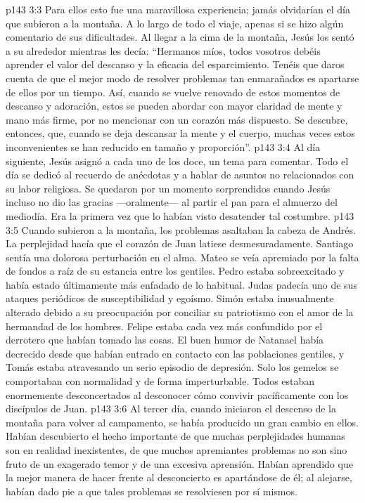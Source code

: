 \vs p143 3:3 \pc Para ellos esto fue una maravillosa experiencia; jamás olvidarían el día que subieron a la montaña. A lo largo de todo el viaje, apenas si se hizo algún comentario de sus dificultades. Al llegar a la cima de la montaña, Jesús los sentó a su alrededor mientras les decía: “Hermanos míos, todos vosotros debéis aprender el valor del descanso y la eficacia del esparcimiento. Tenéis que daros cuenta de que el mejor modo de resolver problemas tan enmarañados es apartarse de ellos por un tiempo. Así, cuando se vuelve renovado de estos momentos de descanso y adoración, estos se pueden abordar con mayor claridad de mente y mano más firme, por no mencionar con un corazón más dispuesto. Se descubre, entonces, que, cuando se deja descansar la mente y el cuerpo, muchas veces estos inconvenientes se han reducido en tamaño y proporción”.
\vs p143 3:4 Al día siguiente, Jesús asignó a cada uno de los doce, un tema para comentar. Todo el día se dedicó al recuerdo de anécdotas y a hablar de asuntos no relacionados con su labor religiosa. Se quedaron por un momento sorprendidos cuando Jesús incluso no dio las gracias ---oralmente--- al partir el pan para el almuerzo del mediodía. Era la primera vez que lo habían visto desatender tal costumbre.
\vs p143 3:5 Cuando subieron a la montaña, los problemas asaltaban la cabeza de Andrés. La perplejidad hacía que el corazón de Juan latiese desmesuradamente. Santiago sentía una dolorosa perturbación en el alma. Mateo se veía apremiado por la falta de fondos a raíz de su estancia entre los gentiles. Pedro estaba sobreexcitado y había estado últimamente más enfadado de lo habitual. Judas padecía uno de sus ataques periódicos de susceptibilidad y egoísmo. Simón estaba inusualmente alterado debido a su preocupación por conciliar su patriotismo con el amor de la hermandad de los hombres. Felipe estaba cada vez más confundido por el derrotero que habían tomado las cosas. El buen humor de Natanael había decrecido desde que habían entrado en contacto con las poblaciones gentiles, y Tomás estaba atravesando un serio episodio de depresión. Solo los gemelos se comportaban con normalidad y de forma imperturbable. Todos estaban enormemente desconcertados al desconocer cómo convivir pacíficamente con los discípulos de Juan.
\vs p143 3:6 Al tercer día, cuando iniciaron el descenso de la montaña para volver al campamento, se había producido un gran cambio en ellos. Habían descubierto el hecho importante de que muchas perplejidades humanas son en realidad inexistentes, de que muchos apremiantes problemas no son sino fruto de un exagerado temor y de una excesiva aprensión. Habían aprendido que la mejor manera de hacer frente al desconcierto es apartándose de él; al alejarse, habían dado pie a que tales problemas se resolviesen por sí mismos.
